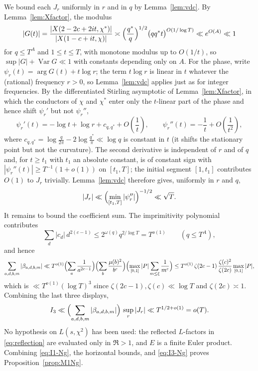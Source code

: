 \documentclass[12pt,a4paper,reqno]{amsart}
\theoremstyle{remark}
\numberwithin{equation}{section}
\begin{document}
We bound each $J_r$ uniformly in $r$ and in $q$ by Lemma~\ref{lem:vdc}. By Lemma~\ref{lem:Xfactor}, the modulus
\[
|G(t)|=\frac{|X(2-2c+2it,\chi^*)|}{|X(1-c+it,\chi)|}\asymp\Bigl(\frac{q^*}{q}\Bigr)^{1/2}\bigl(qq^*t\bigr)^{O(1/\log T)}\ll e^{O(A)}\ll1
\]
for $q\le T^{A}$ and $1\le t\le T$, with monotone modulus up to $O(1/t)$, so $\sup|G|+\operatorname{Var}G\ll1$ with constants depending only on $A$. For the phase, write $\psi_r(t)=\arg G(t)+t\log r$; the term $t\log r$ is linear in $t$ whatever the (rational) frequency $r>0$, so Lemma~\ref{lem:vdc} applies just as for integer frequencies. By the differentiated Stirling asymptotic of Lemma~\ref{lem:Xfactor}, in which the conductors of $\chi$ and $\chi^*$ enter only the $t$-linear part of the phase and hence shift $\psi_r'$ but not $\psi_r''$,
\[
\psi_r'(t)=-\log t+\log r+c_{q,q^*}+O\!\left(\frac1t\right),
\qquad
\psi_r''(t)=-\frac1t+O\!\left(\frac1{t^2}\right),
\]
where $c_{q,q^*}=\log\frac{q}{2\pi}-2\log\frac{q^*}{\pi}\ll\log q$ is constant in $t$ (it shifts the stationary point but not the curvature). The second derivative is independent of $r$ and of $q$ and, for $t\ge t_1$ with $t_1$ an absolute constant, is of constant sign with $|\psi_r''(t)|\ge T^{-1}(1+o(1))$ on $[t_1,T]$; the initial segment $[1,t_1]$ contributes $O(1)$ to $J_r$ trivially. Lemma~\ref{lem:vdc} therefore gives, uniformly in $r$ and $q$,
\[
|J_r|\ll\Bigl(\min_{[t_1,T]}|\psi_r''|\Bigr)^{-1/2}\ll\sqrt T .
\]
It remains to bound the coefficient sum. The imprimitivity polynomial contributes
\[
\sum_d|c_d|\,d^{2(c-1)}\le2^{\omega(q)}q^{2/\log T}=T^{o(1)}
\qquad(q\le T^{A}),
\]
and hence
\[
\sum_{a,d,b,m}|\beta_{a,d,b,m}|
\ll T^{o(1)}\Bigl(\sum_a \frac{1}{a^{2c-1}}\Bigr)\Bigl(\sum_b\frac{\mu(b)^2}{b^{c}}\Bigr)\Bigl(\max_{[0,1]}|P|\sum_{m\le\xi}\frac{1}{m^{c}}\Bigr)
\le T^{o(1)}\,\zeta(2c-1)\,\frac{\zeta(c)^2}{\zeta(2c)}\max_{[0,1]}|P| ,
\]
which is $\ll T^{o(1)}(\log T)^3$ since $\zeta(2c-1),\zeta(c)\ll\log T$ and $\zeta(2c)\asymp1$. Combining the last three displays,
\begin{equation}\label{eq:I3-Ng}
I_3\ll\Bigl(\sum_{a,d,b,m}|\beta_{a,d,b,m}|\Bigr)\,\sup_{r}|J_r|\ll T^{1/2+o(1)}=o(T).
\end{equation}
No hypothesis on $L(s,\chi^2)$ has been used: the reflected $L$-factors in \eqref{eq:reflection} are evaluated only in $\Re>1$, and $E$ is a finite Euler product. Combining \eqref{eq:I1-Ng}, the horizontal bounds, and \eqref{eq:I3-Ng} proves Proposition~\ref{prop:M1Ng}.
\end{document}
